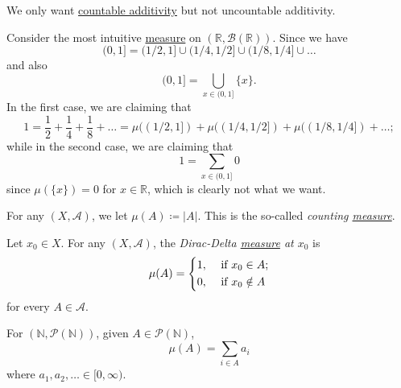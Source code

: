 \begin{remark}
	We only want \hyperref[def:measure-countable-additivity]{countable additivity} but not uncountable additivity.
\end{remark}
\begin{explanation}
	Consider the most intuitive \hyperref[def:measure]{measure} on \((\mathbb{R} , \mathcal{B} (\mathbb{R}))\). Since we have
	\[
		(0, 1] = (1 / 2, 1]\cup (1 / 4, 1 / 2]\cup (1 / 8, 1 / 4]\cup \dots
	\]
	and also
	\[
		(0, 1] = \bigcup_{x\in (0, 1]}\{x\}.
	\]
	In the first case, we are claiming that
	\[
		1
		= \frac{1}{2} + \frac{1}{4} + \frac{1}{8} + \dots
		= \mu((1 / 2, 1]) + \mu((1 / 4, 1 / 2]) + \mu((1 / 8, 1 / 4]) + \dots ;
	\]
	while in the second case, we are claiming that
	\[
		1 = \sum_{x\in(0, 1]} 0
	\]
	since \(\mu(\{ x \} ) = 0\) for \(x\in \mathbb{R} \), which is clearly not what we want.
\end{explanation}

\begin{eg}\label{eg:counting-measure}
	For any \((X, \mathcal{A})\), we let \(\mu(A) \coloneqq \vert A \vert\). This is the so-called \emph{counting \hyperref[def:measure]{measure}}.
\end{eg}
\begin{eg}\label{eg:Dirac-Delta measure}
	Let \(x_0\in X\). For any \((X, \mathcal{A})\), the \emph{Dirac-Delta \hyperref[def:measure]{measure} at \(x_0\)} is
	\[
		\mu(A) = \begin{dcases}
			1, & \text{ if } x_0\in A;   \\
			0, & \text{ if } x_0\notin A
		\end{dcases}
	\]
	for every \(A\in \mathcal{A} \).
\end{eg}
\begin{eg}
	For \((\mathbb{N}, \mathcal{P} (\mathbb{N} ))\), given \(A\in \mathcal{P} (\mathbb{N} )\),
	\[
		\mu(A) = \sum_{i\in A}a_{i}
	\]
	where \(a_1, a_2, \dots \in [0, \infty) \).
\end{eg}